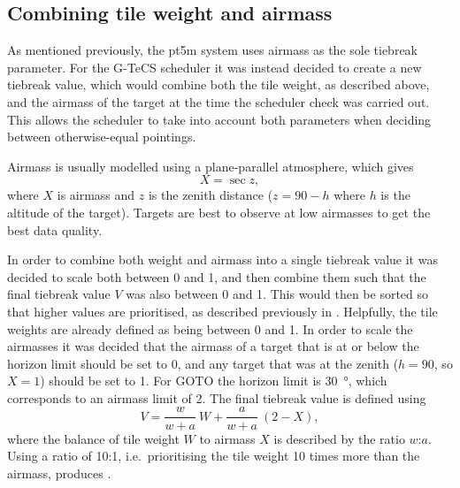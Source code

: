 \subsection{Combining tile weight and airmass}
\label{sec:wa}
\begin{colsection}

As mentioned previously, the pt5m system uses airmass as the sole tiebreak parameter. For the G-TeCS scheduler it was instead decided to create a new tiebreak value, which would combine both the tile weight, as described above, and the airmass of the target at the time the scheduler check was carried out. This allows the scheduler to take into account both parameters when deciding between otherwise-equal pointings.

Airmass is usually modelled using a plane-parallel atmosphere, which gives
%
\begin{equation}
    X = \sec{z},
    \label{eq:airmass}
\end{equation}
%
where $X$ is airmass and $z$ is the zenith distance ($z=90-h$ where $h$ is the altitude of the target). Targets are best to observe at low airmasses to get the best data quality.

In order to combine both weight and airmass into a single tiebreak value it was decided to scale both between 0 and 1, and then combine them such that the final tiebreak value $V$ was also between 0 and 1. This would then be sorted so that higher values are prioritised, as described previously in . Helpfully, the tile weights are already defined as being between 0 and 1. In order to scale the airmasses it was decided that the airmass of a target that is at or below the horizon limit should be set to 0, and any target that was at the zenith ($h=90$, so $X=1$) should be set to 1. For GOTO the horizon limit is \SI{30}{\degree}, which corresponds to an airmass limit of 2. The final tiebreak value is defined using
%
\begin{equation}
    V = \frac{w}{w+a}~W + \frac{a}{w+a}~(2-X),
    \label{eq:wa_ratio}
\end{equation}
%
where the balance of tile weight $W$ to airmass $X$ is described by the ratio $w$:$a$. Using a ratio of 10:1, i.e.\ prioritising the tile weight 10 times more than the airmass, produces .

\newpage

\end{colsection}


